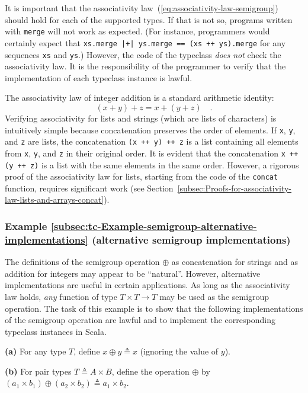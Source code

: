 It is important that the associativity law~(\ref{eq:associativity-law-semigroup})
should hold for each of the supported types. If that is not so, programs
written with \lstinline!merge! will not work as expected. (For instance,
programmers would certainly expect that \lstinline!xs.merge |+| ys.merge == (xs ++ ys).merge!
for any sequences \lstinline!xs! and \lstinline!ys!.) However, the
code of the typeclass \emph{does not} check the associativity law.
It is the responsibility of the programmer to verify that the implementation
of each typeclass instance is lawful. 

The associativity law of integer addition is a standard arithmetic
identity:
\[
\left(x+y\right)+z=x+\left(y+z\right)\quad.
\]
Verifying associativity for lists and strings (which are lists of
characters) is intuitively simple because concatenation preserves
the order of elements. If \lstinline!x!, \lstinline!y!, and \lstinline!z!
are lists, the concatenation \lstinline!(x ++ y) ++ z! is a list
containing all elements from \lstinline!x!, \lstinline!y!, and \lstinline!z!
in their original order. It is evident that the concatenation \lstinline!x ++ (y ++ z)!
is a list with the same elements in the same order. However, a rigorous
proof of the associativity law for lists, starting from the code of
the \lstinline!concat! function, requires significant work (see Section~\ref{subsec:Proofs-for-associativity-law-lists-and-arrays-concat}). 

\subsubsection{Example \label{subsec:tc-Example-semigroup-alternative-implementations}\ref{subsec:tc-Example-semigroup-alternative-implementations}
(alternative semigroup implementations)}

The definitions of the semigroup operation $\oplus$ as concatenation
for strings and as addition for integers may appear to be \textsf{``}natural\textsf{''}.
However, alternative implementations are useful in certain applications.
As long as the associativity law holds, \emph{any} function of type
$T\times T\rightarrow T$ may be used as the semigroup operation.
The task of this example is to show that the following implementations
of the semigroup operation are lawful and to implement the corresponding
typeclass instances in Scala.

\textbf{(a)} For any type $T$, define $x\oplus y\triangleq x$ (ignoring
the value of $y$).

\textbf{(b)} For pair types $T\triangleq A\times B$, define the operation
$\oplus$ by $\left(a_{1}\times b_{1}\right)\oplus\left(a_{2}\times b_{2}\right)\triangleq a_{1}\times b_{2}$.

